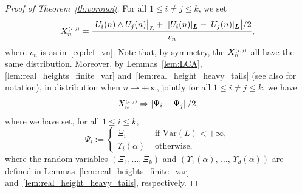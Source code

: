\documentclass[10pt]{amsart}
\theoremstyle{definition}\newtheorem{defi}[theo]{Definition}\newtheorem{rema}[theo]{Remark}\newtheorem{exam}[theo]{Example}\newtheorem{exem}[theo]{Example}\newtheorem{nota}[theo]{Notation}
\newcommand{\bs}{\ensuremath{\boldsymbol}}
\newcommand{\sss}{\ensuremath{\scriptscriptstyle}}
\newcommand{\Var}{\mathrm{Var}}
\begin{document}
\begin{proof}[Proof of Theorem~\ref{th:voronoi}]
For all $1\leq i\neq j\leq k$, we set
\[
X^{\sss (i,j)}_n = \frac{\big|U_i(n)\wedge U_j(n)\big|_{\bs L}+\big||U_i(n)|_{\bs L} - |U_j(n)|_{\bs L}\big|/2}{v_n},
\]
where $v_n$ is as in~\eqref{eq:def_vn}. Note that, by symmetry, the $X_n^{\sss (i,j)}$ all have the same distribution. Moreover, by Lemmas~\ref{lem:LCA}, \ref{lem:real_heights_finite_var} and~\ref{lem:real_height_heavy_tails} (see also for notation), in distribution when $n\to+\infty$, jointly for all $1\leq i\neq j\leq k$, we have
\begin{equation}\label{eq:cvX}
X_n^{\sss (i,j)} \Rightarrow \left|\Psi_i-\Psi_j\right|/2,
\end{equation}
where we have set, for all $1\leq i\leq k$,
\begin{equation}\label{eq:def_Psi}
\Psi_i :=
\begin{cases}
\Xi_i& \text{ if }\Var(L)<+\infty,\\
\Upsilon_i(\alpha)&\text{ otherwise},
\end{cases}
\end{equation}
where the random variables $(\Xi_1, \ldots, \Xi_k)$ and $(\Upsilon_1(\alpha), \,\ldots,\,\Upsilon_d(\alpha))$ are defined in Lemmas~\ref{lem:real_heights_finite_var} and~\ref{lem:real_height_heavy_tails}, respectively.


\end{proof}
\end{document}
